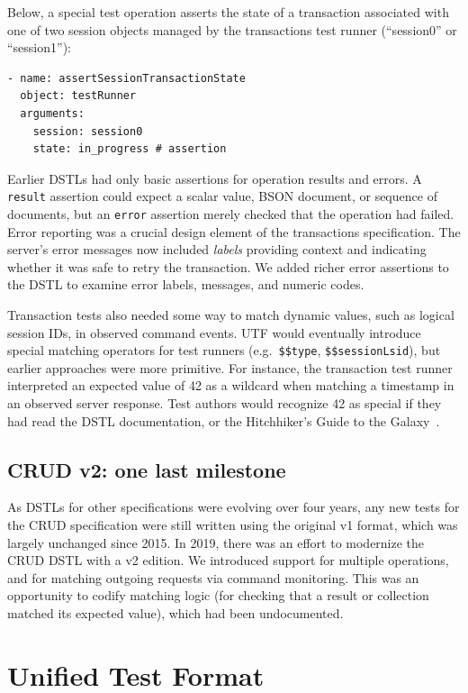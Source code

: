 \documentclass[conference]{IEEEtran}
\begin{document}
Below, a special test operation asserts the state of a transaction associated with one of two session objects managed by the transactions test runner (``session0'' or ``session1''):

\begin{Verbatim}[fontsize=\small, frame=single]
- name: assertSessionTransactionState
  object: testRunner
  arguments:
    session: session0
    state: in_progress # assertion
\end{Verbatim}

Earlier DSTLs had only basic assertions for operation results and errors. A \texttt{result} assertion could expect a scalar value, BSON document, or sequence of documents, but an \texttt{error} assertion merely checked that the operation had failed. Error reporting was a crucial design element of the transactions specification. The server's error messages now included \textit{labels} providing context and indicating whether it was safe to retry the transaction. We added richer error assertions to the DSTL to examine error labels, messages, and numeric codes.

Transaction tests also needed some way to match dynamic values, such as logical session IDs, in observed command events. UTF would eventually introduce special matching operators for test runners (e.g.\ \texttt{\$\$type}, \texttt{\$\$sessionLsid}), but earlier approaches were more primitive. For instance, the transaction test runner interpreted an expected value of 42 as a wildcard when matching a timestamp in an observed server response. Test authors would recognize 42 as special if they had read the DSTL documentation, or the Hitchhiker's Guide to the Galaxy~\cite{adams1979hitchhiker}.

\subsection{CRUD v2: one last milestone}

As DSTLs for other specifications were evolving over four years, any new tests for the CRUD specification were still written using the original v1 format, which was largely unchanged since 2015. In 2019, there was an effort to modernize the CRUD DSTL with a v2 edition. We introduced support for multiple operations, and for matching outgoing requests via command monitoring. This was an opportunity to codify matching logic (for checking that a result or collection matched its expected value), which had been undocumented.

\section{Unified Test Format}
\end{document}
